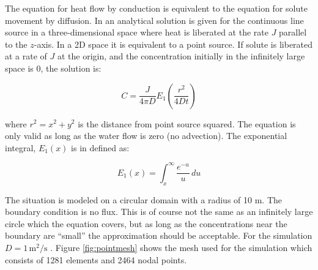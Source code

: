 The equation for heat flow by conduction is equivalent to the
equation for solute movement by diffusion. In \cite{Carslaw} an
analytical solution is given for the continuous line source in a
three-dimensional space where heat is liberated at the rate $J$
parallel to the $z$-axis. In a 2D space it is equivalent to a point
source. If solute is liberated at a rate of $J$ at the origin, and
the concentration initially in the infinitely large space is 0, the
solution is:


\begin{equation}
C=\frac{J}{4\pi D}E_1\left(\frac{r^2}{4Dt}\right)
\end{equation}

where $r^2=x^2+y^2$ is the distance from point source squared. The
equation is only valid as long as the water flow is zero (no
advection). The exponential integral, $E_1(x)$ is in \cite{Abramowitz}
defined as:


\begin{equation}
E_1(x)=\int_{x}^{\infty}\frac{e^{-u}}{u}\, du
\end{equation}

The situation is modeled on a circular domain with a radius of 10
m. The boundary condition is no flux. This is of course not the same
as an infinitely large circle which the equation covers, but as long
as the concentrations near the boundary are ``small'' the
approximation should be acceptable. For the simulation
$D=1\,\text{m}^2/\text{s}$ . Figure \ref{fig:pointmesh} shows the mesh
used for the simulation which consists of 1281 elements and 2464 nodal
points.




